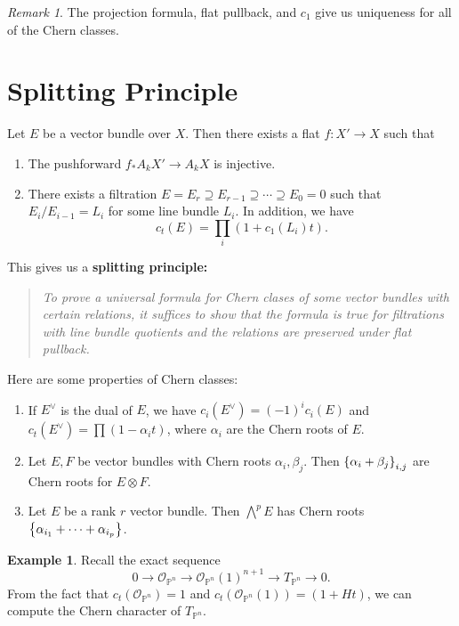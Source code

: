 \documentclass[leqno, openany]{memoir}
\theoremstyle{definition}
\newtheorem{exm}[thm]{Example}
\theoremstyle{remark}
\newtheorem{rmk}[thm]{Remark}
\theoremstyle{plain}
\theoremstyle{definition}
\theoremstyle{remark}
\renewcommand{\P}{\mathbb{P}}
\newcommand{\msc}[1]{\mathscr{#1}}
\begin{document}
\begin{rmk}
    The projection formula, flat pullback, and $c_1$ give us uniqueness for all of the Chern classes.
\end{rmk}

\section{Splitting Principle}%
\label{sec:splitting_construction}

Let $E$ be a vector bundle over $X$. Then there exists a flat $f \colon X' \to X$ such that
\begin{enumerate}
    \item The pushforward $f_* A_k X' \to A_k X$ is injective.
    \item There exists a filtration $E = E_r \supseteq E_{r-1} \supseteq \cdots \supseteq E_0 = 0$ such that $E_i / E_{i-1} = L_i$ for some line bundle $L_i$. In addition, we have
        \[ c_t(E) = \prod_i (1 + c_1(L_i) t). \]
\end{enumerate}

This gives us a \textbf{splitting principle:}
\begin{quotation}
    \textit{To prove a universal formula for Chern clases of some vector bundles with certain relations, it suffices to show that the formula is true for filtrations with line bundle quotients and the relations are preserved under flat pullback.}
\end{quotation}
Here are some properties of Chern classes:
\begin{enumerate}
    \item If $E^{\vee}$ is the dual of $E$, we have $c_i(E^{\vee}) = {(-1)}^i c_i(E)$ and $c_t(E^{\vee}) = \prod (1 - \alpha_i t)$, where $\alpha_i$ are the Chern roots of $E$.
    \item Let $E, F$ be vector bundles with Chern roots $\alpha_i, \beta_j$. Then $\qty{\alpha_i + \beta_j}_{i,j}$ are Chern roots for $E \otimes F$.
    \item Let $E$ be a rank $r$ vector bundle. Then $\bigwedge^p E$ has Chern roots $\qty{\alpha_{i_1} + \cdots + \alpha_{i_p}}$.
\end{enumerate}

\begin{exm}
    Recall the exact sequence
    \[ 0 \to \msc{O}_{\P^n} \to \msc{O}_{\P^n}(1)^{n+1} \to T_{\P^n} \to 0. \]
    From the fact that $c_t(\msc{O}_{\P^n}) = 1$ and $c_t(\msc{O}_{\P^n}(1)) = (1+H t)$, we can compute the Chern character of $T_{\P^n}$.
\end{exm}
\end{document}

